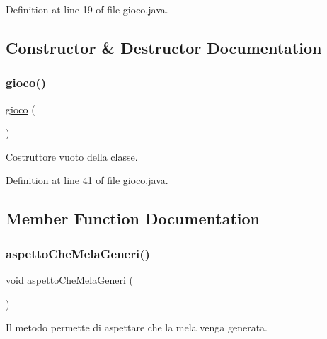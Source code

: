 Definition at line 19 of file gioco.\+java.



\subsection{Constructor \& Destructor Documentation}
\mbox{\label{class_snake_1_1game_1_1gioco_aaa8e0aba7a5f3cd7781bd0461d415f9e}} 
\subsubsection{\texorpdfstring{gioco()}{gioco()}}
{\footnotesize\ttfamily \mbox{\hyperlink{class_snake_1_1game_1_1gioco}{gioco}} (\begin{DoxyParamCaption}{ }\end{DoxyParamCaption})\hspace{0.3cm}{\ttfamily [private]}}



Costruttore vuoto della classe. 



Definition at line 41 of file gioco.\+java.



\subsection{Member Function Documentation}
\mbox{\label{class_snake_1_1game_1_1gioco_a6eb3176cbeae2780913116900dd2d141}} 
\subsubsection{\texorpdfstring{aspetto\+Che\+Mela\+Generi()}{aspettoCheMelaGeneri()}}
{\footnotesize\ttfamily void aspetto\+Che\+Mela\+Generi (\begin{DoxyParamCaption}{ }\end{DoxyParamCaption})}



Il metodo permette di aspettare che la mela venga generata. 



